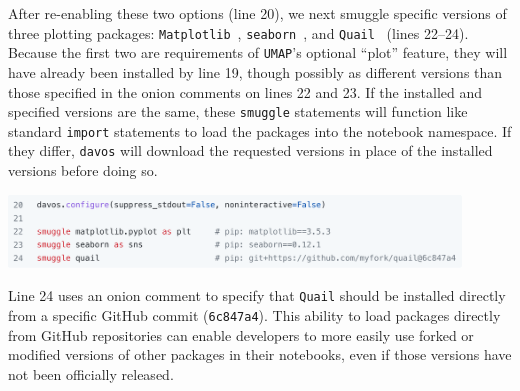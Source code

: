 \documentclass[preprint,12pt,a4paper]{elsarticle}
\begin{document}
After re-enabling these two options (line 20), we next smuggle
specific versions of three plotting packages:
\texttt{Matplotlib}~\cite{Hunt07}, \texttt{seaborn}~\cite{Wask21}, and
\texttt{Quail}~\cite{HeusEtal17} (lines 22--24). Because the first two
are requirements of \texttt{UMAP}'s optional ``plot'' feature, they
will have already been installed by line 19, though possibly as
different versions than those specified in the onion comments on lines
22 and 23. If the installed and specified versions are the same, these
\texttt{smuggle} statements will function like standard \texttt{import}
statements to load the packages into the notebook namespace. If they
differ, \texttt{davos} will download the requested versions in place
of the installed versions before doing so.
\begin{center}
\includegraphics[width=0.9\textwidth]{figs/example5}
\end{center}
Line 24 uses an onion comment to specify that \texttt{Quail} should be
installed directly from a specific GitHub commit (\texttt{6c847a4}).
This ability to load packages directly from GitHub repositories can
enable developers to more easily use forked or modified versions of other
packages in their notebooks, even if those versions have not been
officially released.
\end{document}
